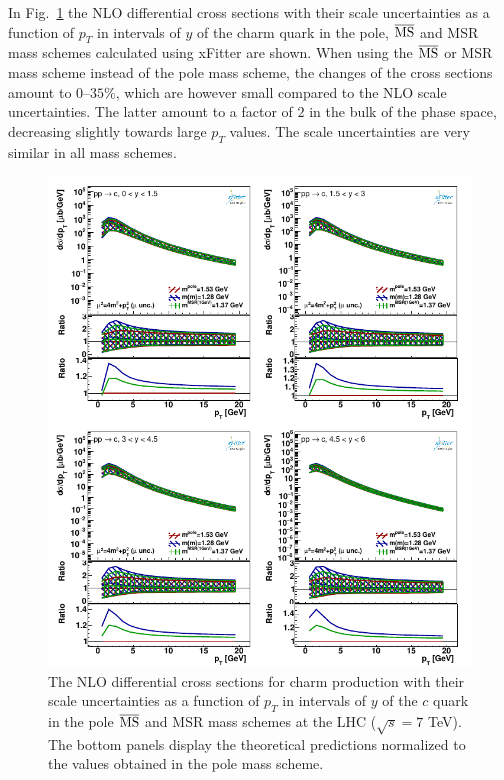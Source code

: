 \documentclass[12pt,a4paper]{article}
\newcommand{\msbar}{\ensuremath{\overline{\rm MS}}\xspace}
\begin{document}
In Fig.~\ref{fig:c-pty-mu} the NLO differential cross sections with their scale uncertainties as a function of $p_T$ in intervals of $y$ of the charm quark in the pole, \msbar and MSR mass schemes calculated using xFitter are shown. When using the \msbar or MSR mass scheme instead of the pole mass scheme, the changes of the cross sections amount to $0\textrm{--}35\%$, which are however small compared to the NLO scale uncertainties. The latter amount to a factor of $2$ in the bulk of the phase space, decreasing slightly towards large $p_T$ values. The scale uncertainties are very similar in all mass schemes.

\begin{figure}
    \centering
    \includegraphics[width=1.00\textwidth]{figs/parton-ptmax20/dyn-therr3-all.pdf}
    \caption{The NLO differential cross sections for charm production with their scale uncertainties as a function of $p_T$ in intervals of $y$ of the $c$ quark in the pole \msbar and MSR mass schemes at the LHC ($\sqrt{s} = 7$ TeV). The bottom panels display the theoretical predictions normalized to the values obtained in the pole mass scheme.}
    \label{fig:c-pty-mu}
\end{figure}
\end{document}
